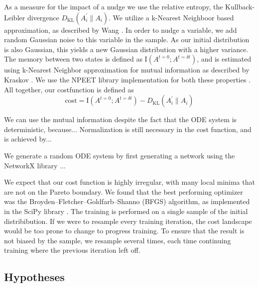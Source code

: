 \documentclass[../main.tex]{subfiles}
\begin{document}
As a measure for the impact of a nudge we use the relative entropy, the Kullback-Leibler divergence $D_\mathrm{KL}(A_i^\prime \| A_i)$.
We utilize a k-Nearest Neighboor based approximation, as described by Wang \cite{wang2009divergence}.
In order to nudge a variable, we add random Gaussian noise to this variable in the sample.
As our initial distribution is also Gaussian, this yields a new Gaussian distribution with a higher variance.
The memory between two states is defined as $\mathrm{I}(A^{t=0};A^{t = \delta t})$, and is estimated using k-Nearest Neighbor approximation for mutual information as described by Kraskov \cite{kraskov2004estimating}.
We use the NPEET library implementation for both these properties \cite{versteeg2013NPEET}.
All together, our costfunction is defined as
%
\begin{equation}
\mathrm{cost} = \mathrm{I}(A^{t=0};A^{t = \delta t}) - D_\mathrm{KL}(A_i^\prime \| A_i)
\end{equation}
%

We can use the mutual information despite the fact that the ODE system is deterministic, because...
Normalization is still necessary in the cost function, and is achieved by...

We generate a random ODE system by first generating a network using the NetworkX library \cite{networkx}...

We expect that our cost function is highly irregular, with many local minima that are not on the Pareto boundary.
We found that the best performing optimizer was the Broyden–Fletcher–Goldfarb–Shanno (BFGS) algorithm, as implemented in the SciPy library \cite{fletcher2013practical, scipy}.
The training is performed on a single sample of the initial distribibution.
If we were to resample every training iteration, the cost landscape would be too prone to change to progress training.
To ensure that the result is not biased by the sample, we resample several times, each time continuing training where the previous iteration left off.

\subsection{Hypotheses}
\end{document}
